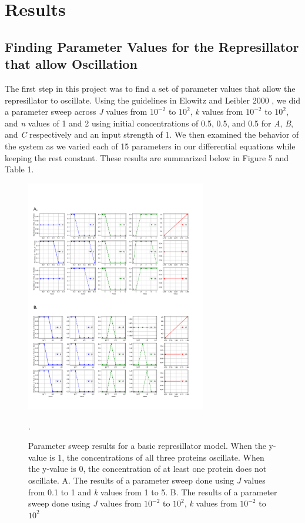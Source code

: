 \documentclass{article}
\begin{document}
\section{Results}

\subsection{Finding Parameter Values for the Represillator that allow Oscillation}

The first step in this project was to find a set of parameter values that allow the represillator to oscillate. Using the guidelines in Elowitz and Leibler 2000 \cite{represillator}, we did a parameter sweep across \textit{J} values from \( 10^{-2} \) to \( 10^{2} \), \textit{k} values from \( 10^{-2} \) to \( 10^{2} \), and \textit{n} values of 1 and 2 using initial concentrations of 0.5, 0.5, and 0.5 for \textit{A}, \textit{B}, and \textit{C} respectively and an input strength of 1.  We then examined the behavior of the system as we varied each of 15 parameters in our differential equations while keeping the rest constant. These results are summarized below in Figure 5 and Table 1.  


\begin{figure}[H]
    \centering
    \includegraphics[width=0.7\textwidth]{figure5.pdf}
    \caption{Parameter sweep results for a basic represillator model. When the y-value is 1, the concentrations of all three proteins oscillate. When the y-value is 0, the concentration of at least one protein does not oscillate. A. The results of a parameter sweep done using \textit{J} values from 0.1 to 1 and \textit{k} values from 1 to 5. B. The results of a parameter sweep done using \textit{J} values from \( 10^{-2} \) to \( 10^{2} \), \textit{k} values from \( 10^{-2} \) to \( 10^{2} \)}. 
    \label{fig:5}
\end{figure}
\end{document}
